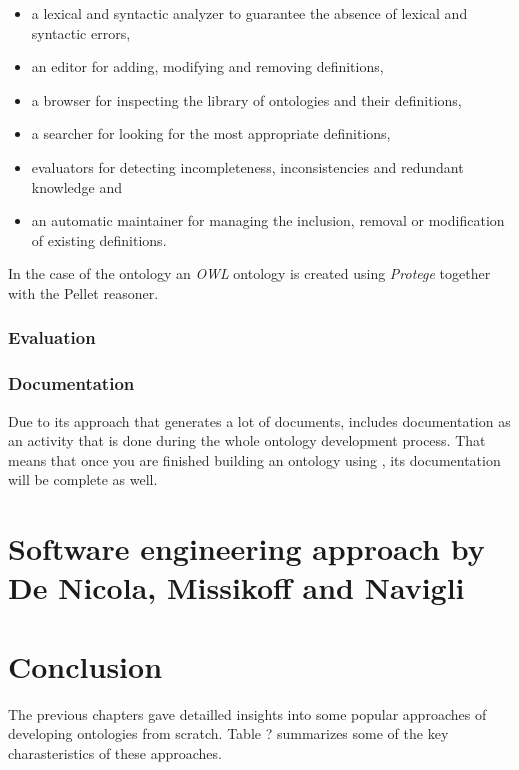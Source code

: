 \begin{itemize}
  \item a lexical and syntactic analyzer to guarantee the absence of lexical and syntactic errors,
  \item an editor for adding, modifying and removing definitions,
  \item a browser for inspecting the library of ontologies and their definitions,
  \item a searcher for looking for the most appropriate definitions,
  \item evaluators for detecting incompleteness, inconsistencies and redundant knowledge and
  \item an automatic maintainer for managing the inclusion, removal or modification of existing definitions.
\end{itemize}
 

In the case of the \thinkhomeweather ontology an \emph{OWL} ontology is created using \emph{Protege} together with the Pellet reasoner.

\subsubsection{Evaluation}


\subsubsection{Documentation}

Due to its approach that generates a lot of documents, \methontology includes documentation as an activity that is done during the whole ontology development process. That means that once you are finished building an ontology using \methontology, its documentation will be complete as well.

\section{Software engineering approach by De Nicola, Missikoff and Navigli}

\section{Conclusion}

The previous chapters gave detailled insights into some popular approaches of developing ontologies from scratch. Table ? summarizes some of the key charasteristics of these approaches.


